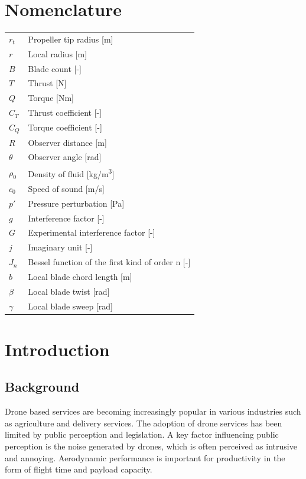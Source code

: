 \documentclass[12pt,a4paper]{article}
\begin{document}
\section*{Nomenclature}
\begin{tabular}{ll}
    $r_t$        & Propeller tip radius [m] \\
    $r$        & Local radius [m] \\
    $B$        & Blade count [-] \\
    $T$        & Thrust [N] \\
    $Q$        & Torque [Nm] \\
    $C_T$      & Thrust coefficient [-] \\
    $C_Q$      & Torque coefficient [-] \\
    $R$        & Observer distance [m] \\
    $\theta$   & Observer angle [rad] \\
    $\rho_0$     & Density of fluid [kg/m\textsuperscript{3}] \\
    $c_0$   & Speed of sound [m/s] \\
    $p'$      & Pressure perturbation [Pa] \\
    $g$      & Interference factor [-] \\
    $G$     & Experimental interference factor [-] \\
    $j$     & Imaginary unit [-] \\
    $J_{n}$ & Bessel function of the first kind of order n [-] \\
    $b$      & Local blade chord length [m] \\
    $\beta$  & Local blade twist [rad] \\
    $\gamma$ & Local blade sweep [rad] \\
\end{tabular}

\newpage
\section{Introduction}

\subsection{Background}

Drone based services are becoming increasingly popular in various industries such as agriculture and delivery services.
The adoption of drone services has been limited by public perception and legislation.
A key factor influencing public perception is the noise generated by drones, which is often perceived as intrusive and annoying.
Aerodynamic performance is important for productivity in the form of flight time and payload capacity.
\end{document}
